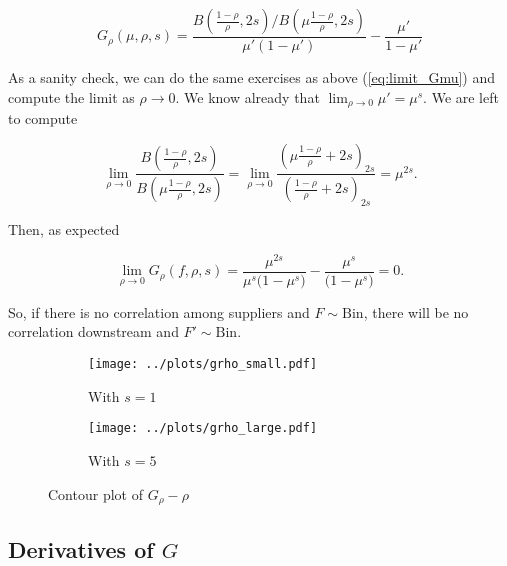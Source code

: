 \documentclass[american, abstract=on]{scrartcl}
\theoremstyle{plain}
\newcommand{\Bin}{\text{Bin}}
\begin{document}
\begin{equation}
    G_{\rho}(\mu, \rho, s) = \frac{ B\left(\frac{1 - \rho}{\rho}, 2s \right) \Big/ B\left(\mu \frac{1 - \rho}{\rho}, 2s \right)}{\mu' (1 - \mu')} - \frac{\mu'}{1 - \mu'}
\end{equation}

As a sanity check, we can do the same exercises as above (\ref{eq:limit_Gmu}) and compute the limit as $\rho \rightarrow 0$. We know already that $\lim_{\rho \rightarrow 0} \mu' = \mu^s$. We are left to compute

\begin{equation}
    \lim_{\rho \rightarrow 0} \frac{B\left(\frac{1 - \rho}{\rho}, 2s \right)}{B\left(\mu \frac{1 - \rho}{\rho}, 2s \right)} = \lim_{\rho \rightarrow 0} \frac{\left(\mu \frac{1 - \rho}{\rho} + 2s\right)_{2s}}{\left(\frac{1 - \rho}{\rho} + 2s\right)_{2s}} = \mu^{2s}.
\end{equation}

Then, as expected

\begin{equation}
    \lim_{\rho \rightarrow 0} G_{\rho}(f, \rho, s) = \frac{\mu^{2s}}{\mu^s \big(1 - \mu^s\big)} - \frac{\mu^s}{\big(1 - \mu^s\big)} = 0.
\end{equation}

So, if there is no correlation among suppliers and $F \sim \Bin$, there will be no correlation downstream and $F' \sim \Bin$.

\begin{figure}[H]
    \centering
    \begin{subfigure}{.5\textwidth}
      \centering
      \texttt{[image: ../plots/grho\_small.pdf]} 
      \caption{With $s = 1$}
      \label{fig:grho:small}  
    \end{subfigure}%
    \begin{subfigure}{.5\textwidth}
      \centering
      \texttt{[image: ../plots/grho\_large.pdf]}       
      \caption{With $s = 5$}
      \label{fig:grho:large}
    \end{subfigure}
    \caption{Contour plot of $G_\rho - \rho$}
    \label{fig:grho}
  \end{figure}

\iffalse

\subsection[Derivatives of map]{Derivatives of $G$}
\end{document}
